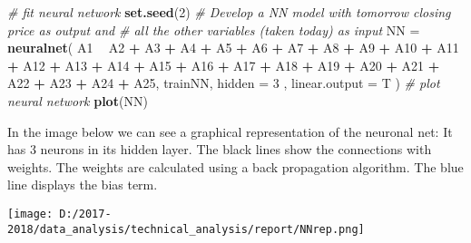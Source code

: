 \documentclass[
  11pt,
]{article}
\newenvironment{Shaded}{\begin{snugshade}}{\end{snugshade}}
\newcommand{\CommentTok}[1]{\textcolor[rgb]{0.56,0.35,0.01}{\textit{#1}}}
\newcommand{\DataTypeTok}[1]{\textcolor[rgb]{0.13,0.29,0.53}{#1}}
\newcommand{\DecValTok}[1]{\textcolor[rgb]{0.00,0.00,0.81}{#1}}
\newcommand{\KeywordTok}[1]{\textcolor[rgb]{0.13,0.29,0.53}{\textbf{#1}}}
\newcommand{\NormalTok}[1]{#1}
\newcommand{\OperatorTok}[1]{\textcolor[rgb]{0.81,0.36,0.00}{\textbf{#1}}}
\newcommand{\StringTok}[1]{\textcolor[rgb]{0.31,0.60,0.02}{#1}}
\let\origfigure\figure
\let\endorigfigure\endfigure
\renewenvironment{figure}[1][2] {
    \expandafter\origfigure\expandafter[H]
} {
    \endorigfigure
}
\begin{document}
\begin{Shaded}
\begin{Highlighting}[]
\CommentTok{# fit neural network}
\KeywordTok{set.seed}\NormalTok{(}\DecValTok{2}\NormalTok{)}
\CommentTok{# Develop a NN model with tomorrow closing price as output and}
\CommentTok{# all the other variables (taken today) as input}
\NormalTok{NN =}\StringTok{ }\KeywordTok{neuralnet}\NormalTok{( A1 }\OperatorTok{~}\StringTok{ }\NormalTok{A2 }\OperatorTok{+}\StringTok{ }\NormalTok{A3 }\OperatorTok{+}\StringTok{ }\NormalTok{A4 }\OperatorTok{+}\StringTok{ }\NormalTok{A5 }\OperatorTok{+}\StringTok{ }\NormalTok{A6 }\OperatorTok{+}\StringTok{ }\NormalTok{A7 }\OperatorTok{+}\StringTok{ }\NormalTok{A8 }\OperatorTok{+}\StringTok{ }\NormalTok{A9 }\OperatorTok{+}\StringTok{ }\NormalTok{A10}
\OperatorTok{+}\StringTok{ }\NormalTok{A11 }\OperatorTok{+}\StringTok{ }\NormalTok{A12 }\OperatorTok{+}\StringTok{ }\NormalTok{A13 }\OperatorTok{+}\StringTok{ }\NormalTok{A14 }\OperatorTok{+}\StringTok{ }\NormalTok{A15 }\OperatorTok{+}\StringTok{ }\NormalTok{A16 }\OperatorTok{+}\StringTok{ }\NormalTok{A17 }\OperatorTok{+}\StringTok{ }\NormalTok{A18 }\OperatorTok{+}\StringTok{ }\NormalTok{A19 }\OperatorTok{+}\StringTok{ }\NormalTok{A20 }\OperatorTok{+}\StringTok{ }\NormalTok{A21}
\OperatorTok{+}\StringTok{ }\NormalTok{A22 }\OperatorTok{+}\StringTok{ }\NormalTok{A23 }\OperatorTok{+}\StringTok{ }\NormalTok{A24 }\OperatorTok{+}\StringTok{ }\NormalTok{A25, trainNN, }\DataTypeTok{hidden =} \DecValTok{3}\NormalTok{ , }\DataTypeTok{linear.output =}\NormalTok{ T ) }
\CommentTok{# plot neural network}
\KeywordTok{plot}\NormalTok{(NN)}
\end{Highlighting}
\end{Shaded}

In the image below we can see a graphical representation of the neuronal
net: It has 3 neurons in its hidden layer. The black lines show the
connections with weights. The weights are calculated using a back
propagation algorithm. The blue line displays the bias term.

\begin{figure}
\centering
\texttt{[image: D:/2017-2018/data\_analysis/technical\_analysis/report/NNrep.png]}
\caption{Caption for the picture.}
\end{figure}
\end{document}
